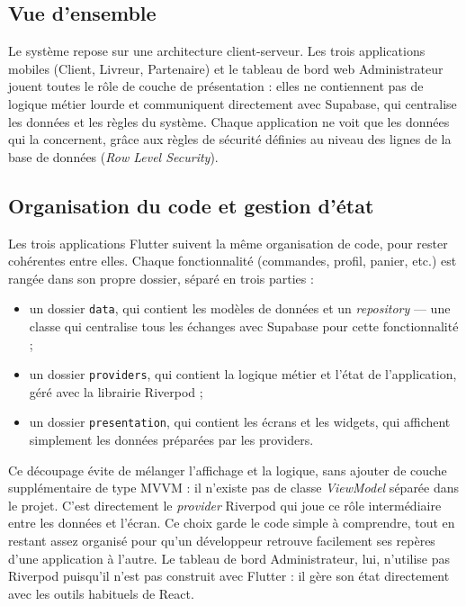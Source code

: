 \documentclass[12pt,fleqn,a4paper]{report}
\begin{document}
\begin{justify}
\subsection{Vue d'ensemble}

Le système repose sur une architecture client-serveur. Les trois applications mobiles (Client, Livreur, Partenaire) et le tableau de bord web Administrateur jouent toutes le rôle de couche de présentation : elles ne contiennent pas de logique métier lourde et communiquent directement avec Supabase, qui centralise les données et les règles du système. Chaque application ne voit que les données qui la concernent, grâce aux règles de sécurité définies au niveau des lignes de la base de données (\textit{Row Level Security}).

\subsection{Organisation du code et gestion d'état}

Les trois applications Flutter suivent la même organisation de code, pour rester cohérentes entre elles. Chaque fonctionnalité (commandes, profil, panier, etc.) est rangée dans son propre dossier, séparé en trois parties :

\begin{itemize}
    \item un dossier \texttt{data}, qui contient les modèles de données et un \emph{repository} — une classe qui centralise tous les échanges avec Supabase pour cette fonctionnalité ;
    \item un dossier \texttt{providers}, qui contient la logique métier et l'état de l'application, géré avec la librairie Riverpod ;
    \item un dossier \texttt{presentation}, qui contient les écrans et les widgets, qui affichent simplement les données préparées par les providers.
\end{itemize}

Ce découpage évite de mélanger l'affichage et la logique, sans ajouter de couche supplémentaire de type MVVM : il n'existe pas de classe \emph{ViewModel} séparée dans le projet. C'est directement le \emph{provider} Riverpod qui joue ce rôle intermédiaire entre les données et l'écran. Ce choix garde le code simple à comprendre, tout en restant assez organisé pour qu'un développeur retrouve facilement ses repères d'une application à l'autre. Le tableau de bord Administrateur, lui, n'utilise pas Riverpod puisqu'il n'est pas construit avec Flutter : il gère son état directement avec les outils habituels de React.


\end{justify}
\end{document}
